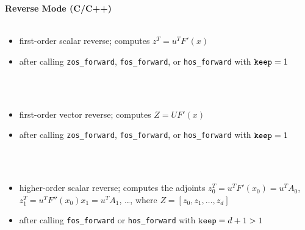 \documentclass[12pt,oneside,a4paper]{article}
\begin{document}
\newpage
\begin{center}\Large
{\Large \bf  Reverse Mode (C/C++)}\\[2ex]
%
\\[2ex]
\begin{minipage}[h]{14cm}
\small 
\begin{itemize}
\item first-order scalar reverse; computes $z^T=u^T F'\left(x\right)$
\item after calling  {\tt zos\_forward}, {\tt fos\_forward}, or 
      {\tt hos\_forward} with $\text{\tt keep}=1$
\end{itemize}
\end{minipage}\\[2ex]
%
\\[2ex]
\begin{minipage}[h]{14cm}
\small 
\begin{itemize}
\item first-order vector reverse; computes $Z=U F'\left(x\right)$
\item after calling  {\tt zos\_forward}, {\tt fos\_forward}, or 
      {\tt hos\_forward} with $\text{\tt keep}=1$
\end{itemize}
\end{minipage}\\[2ex]
%
%
\\[2ex]
\begin{minipage}[h]{14cm}
\small 
\begin{itemize}
\item higher-order scalar reverse; computes the adjoints
      \mbox{$z_0^T=u^T F'\left(x_0\right)=u^T A_0$},
      \mbox{$z_1^T=u^T F''\left(x_0\right)x_1=u^T A_1$}, 
      \ldots, where $Z=[z_0,z_1,\ldots,z_d]$
\item after calling  {\tt fos\_forward} or 
      {\tt hos\_forward} with $\text{\tt keep}=d+1>1$
\end{itemize}

\end{minipage}
\end{center}
\end{document}
